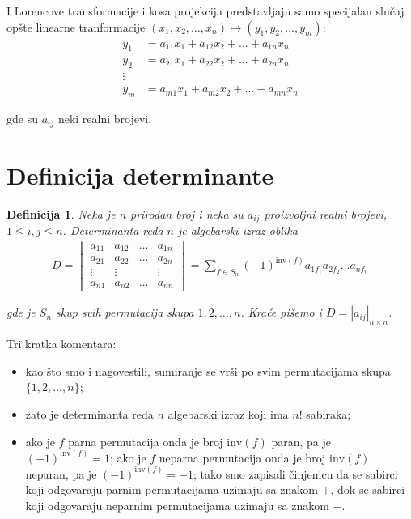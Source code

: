 \documentclass[11pt]{article}
\theoremstyle{masulthm}
\theoremstyle{masuldef}
\newtheorem{definition}{Definicija}[section]
\theoremstyle{masulexmp}
\theoremstyle{masulproof}
\newcommand{\inv}[1]{\text{inv}(#1)}
\begin{document}
\noindent
I Lorencove transformacije i kosa projekcija predstavljaju samo specijalan slučaj opšte linearne tranformacije $ (x_1, x_2, \dots, x_n) \mapsto (y_1, y_2, \dots, y_m) $:
\begin{align*}
    y_1 & = a_{11} x_1 + a_{12} x_2 + \dots + a_{1n} x_n \\
    y_2 & = a_{21} x_1 + a_{22} x_2 + \dots + a_{2n} x_n \\
    \vdots \\
    y_m & = a_{m1} x_1 + a_{m2} x_2 + \dots + a_{mn} x_n
\end{align*}

\noindent
gde su $ a_{ij} $ neki realni brojevi.

\section{Definicija determinante}

\begin{definition}

Neka je $ n $ prirodan broj i neka su $ a_{ij} $ proizvoljni realni brojevi, $ 1 \leq i, j \leq n $.
Determinanta reda $ n $ je algebarski izraz oblika
\begin{align*}
    D =
    \begin{vmatrix}
        a_{11} & a_{12} & \dots & a_{1n} \\
        a_{21} & a_{22} & \dots & a_{2n} \\
        \vdots & \vdots &       & \vdots \\
        a_{n1} & a_{n2} & \dots & a_{nn}
    \end{vmatrix}
    = \sum_{f \in S_{n}} (-1)^{\inv{f}} a_{1f_1} a_{2f_2} \dots a_{nf_n}
\end{align*}

gde je $ S_n $ skup svih permutacija skupa $ {1, 2, \dots, n} $.
Kraće pišemo i $ D = |a_{ij}|_{n \times n} $.

\end{definition}

\noindent
Tri kratka komentara:

\begin{itemize}
    \item kao što smo i nagovestili, sumiranje se vrši po svim permutacijama skupa $ \{1, 2, \dots, n\} $;

    \item zato je determinanta reda $ n $ algebarski izraz koji ima $ n! $ sabiraka;

    \item ako je $ f $ parna permutacija onda je broj $ \inv{f} $ paran, pa je $ (-1)^{\inv{f}} = 1 $;
ako je $ f $ neparna permutacija onda je broj $ \inv{f} $ neparan, pa je $ (-1)^{\inv{f}} = -1 $;
tako smo zapisali činjenicu da se sabirci koji odgovaraju parnim permutacijama uzimaju sa znakom $ + $,
dok se sabirci koji odgovaraju neparnim permutacijama uzimaju sa znakom $ - $.
\end{itemize}
\end{document}
